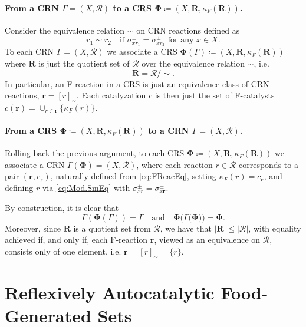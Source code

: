\documentclass[pdflatex]{sn-jnl}
\theoremstyle{thmstyleone}%
\theoremstyle{examplesty}%
\theoremstyle{thmstylethree}%
\newcommand{\FR}[0]{\mathbf{R}}
\newcommand{\fr}[0]{\mathbf{r}}
\newcommand{\cat}{\kappa_F}
\begin{document}
\paragraph{From a CRN $\Gamma=(X,\mathcal{R})$ to a CRS
  $\mathbf{\Phi}\coloneqq (X, \FR, \cat(\FR))$.}
Consider the equivalence relation $\sim$ on CRN reactions defined as
\begin{equation}\label{eq:EqRel}
    r_1 \sim r_2 \quad \text{if $\sigma_{xr_1}^{\pm}=\sigma_{xr_2}^{\pm}$ for any $x\in X$.}
\end{equation}
To each CRN $\Gamma=(X,\mathcal{R})$ we associate a CRS
$\mathbf{\Phi}(\Gamma)\coloneqq (X, \FR, \cat(\FR))$ where $\FR$ is just
the quotient set of $\mathcal{R}$ over the equivalence relation $\sim$,
i.e.
\begin{equation}
    \FR= \mathcal{R}/\sim.
\end{equation}
In particular, an F-reaction in a CRS is just an equivalence class of CRN
reactions, $\fr=[r]_{\sim}$. Each catalyzation $c$ is then just the set of
F-catalysts $c(\mathbf{r})=\cup_ {r\in \fr}\{\cat(r)\}$.

\paragraph{From a CRS $\mathbf{\Phi}\coloneqq (X, \FR, \cat(\FR))$ to a CRN
  $\Gamma=(X,\mathcal{R})$.} Rolling back the previous
argument, to each CRS $\mathbf{\Phi}\coloneqq (X, \FR, \cat(\FR))$ we
associate a CRN $\Gamma (\mathbf{\Phi})=(X,\mathcal{R})$, where each
reaction $r\in \mathcal{R}$ corresponds to a pair $(\fr,c_\fr)$, naturally
defined from \eqref{eq:FReacEq}, setting $\cat(r)=c_\fr$, and defining $r$
via \eqref{eq:Mod.SmEq} with $\sigma^{\pm}_{xr}=\sigma^{\pm}_{x\fr}$.

By construction, it is clear that 
\begin{equation}
  \Gamma(\mathbf{\Phi}(\Gamma))=\Gamma \quad \text{and}
  \quad \mathbf{\Phi}(\Gamma(\mathbf{\Phi))}=\mathbf{\Phi}.
\end{equation}
Moreover, since $\FR$ is a quotient set from $\mathcal{R}$, we have that
$|\FR| \le |\mathcal{R}|$, with equality achieved if, and only if, each
F-reaction $\fr$, viewed as an equivalence on $\mathcal{R}$, consists only
of one element, i.e.  $\fr=[r]_{\sim}=\{r\}$.

\section{Reflexively Autocatalytic Food-Generated Sets}\label{sec:RAF}
\end{document}
